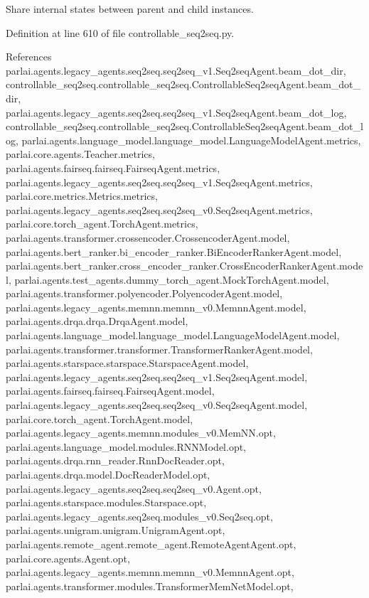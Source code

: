 \begin{DoxyVerb}Share internal states between parent and child instances.\end{DoxyVerb}
 

Definition at line 610 of file controllable\+\_\+seq2seq.\+py.



References parlai.\+agents.\+legacy\+\_\+agents.\+seq2seq.\+seq2seq\+\_\+v1.\+Seq2seq\+Agent.\+beam\+\_\+dot\+\_\+dir, controllable\+\_\+seq2seq.\+controllable\+\_\+seq2seq.\+Controllable\+Seq2seq\+Agent.\+beam\+\_\+dot\+\_\+dir, parlai.\+agents.\+legacy\+\_\+agents.\+seq2seq.\+seq2seq\+\_\+v1.\+Seq2seq\+Agent.\+beam\+\_\+dot\+\_\+log, controllable\+\_\+seq2seq.\+controllable\+\_\+seq2seq.\+Controllable\+Seq2seq\+Agent.\+beam\+\_\+dot\+\_\+log, parlai.\+agents.\+language\+\_\+model.\+language\+\_\+model.\+Language\+Model\+Agent.\+metrics, parlai.\+core.\+agents.\+Teacher.\+metrics, parlai.\+agents.\+fairseq.\+fairseq.\+Fairseq\+Agent.\+metrics, parlai.\+agents.\+legacy\+\_\+agents.\+seq2seq.\+seq2seq\+\_\+v1.\+Seq2seq\+Agent.\+metrics, parlai.\+core.\+metrics.\+Metrics.\+metrics, parlai.\+agents.\+legacy\+\_\+agents.\+seq2seq.\+seq2seq\+\_\+v0.\+Seq2seq\+Agent.\+metrics, parlai.\+core.\+torch\+\_\+agent.\+Torch\+Agent.\+metrics, parlai.\+agents.\+transformer.\+crossencoder.\+Crossencoder\+Agent.\+model, parlai.\+agents.\+bert\+\_\+ranker.\+bi\+\_\+encoder\+\_\+ranker.\+Bi\+Encoder\+Ranker\+Agent.\+model, parlai.\+agents.\+bert\+\_\+ranker.\+cross\+\_\+encoder\+\_\+ranker.\+Cross\+Encoder\+Ranker\+Agent.\+model, parlai.\+agents.\+test\+\_\+agents.\+dummy\+\_\+torch\+\_\+agent.\+Mock\+Torch\+Agent.\+model, parlai.\+agents.\+transformer.\+polyencoder.\+Polyencoder\+Agent.\+model, parlai.\+agents.\+legacy\+\_\+agents.\+memnn.\+memnn\+\_\+v0.\+Memnn\+Agent.\+model, parlai.\+agents.\+drqa.\+drqa.\+Drqa\+Agent.\+model, parlai.\+agents.\+language\+\_\+model.\+language\+\_\+model.\+Language\+Model\+Agent.\+model, parlai.\+agents.\+transformer.\+transformer.\+Transformer\+Ranker\+Agent.\+model, parlai.\+agents.\+starspace.\+starspace.\+Starspace\+Agent.\+model, parlai.\+agents.\+legacy\+\_\+agents.\+seq2seq.\+seq2seq\+\_\+v1.\+Seq2seq\+Agent.\+model, parlai.\+agents.\+fairseq.\+fairseq.\+Fairseq\+Agent.\+model, parlai.\+agents.\+legacy\+\_\+agents.\+seq2seq.\+seq2seq\+\_\+v0.\+Seq2seq\+Agent.\+model, parlai.\+core.\+torch\+\_\+agent.\+Torch\+Agent.\+model, parlai.\+agents.\+legacy\+\_\+agents.\+memnn.\+modules\+\_\+v0.\+Mem\+N\+N.\+opt, parlai.\+agents.\+language\+\_\+model.\+modules.\+R\+N\+N\+Model.\+opt, parlai.\+agents.\+drqa.\+rnn\+\_\+reader.\+Rnn\+Doc\+Reader.\+opt, parlai.\+agents.\+drqa.\+model.\+Doc\+Reader\+Model.\+opt, parlai.\+agents.\+legacy\+\_\+agents.\+seq2seq.\+seq2seq\+\_\+v0.\+Agent.\+opt, parlai.\+agents.\+starspace.\+modules.\+Starspace.\+opt, parlai.\+agents.\+legacy\+\_\+agents.\+seq2seq.\+modules\+\_\+v0.\+Seq2seq.\+opt, parlai.\+agents.\+unigram.\+unigram.\+Unigram\+Agent.\+opt, parlai.\+agents.\+remote\+\_\+agent.\+remote\+\_\+agent.\+Remote\+Agent\+Agent.\+opt, parlai.\+core.\+agents.\+Agent.\+opt, parlai.\+agents.\+legacy\+\_\+agents.\+memnn.\+memnn\+\_\+v0.\+Memnn\+Agent.\+opt, parlai.\+agents.\+transformer.\+modules.\+Transformer\+Mem\+Net\+Model.\+opt, 